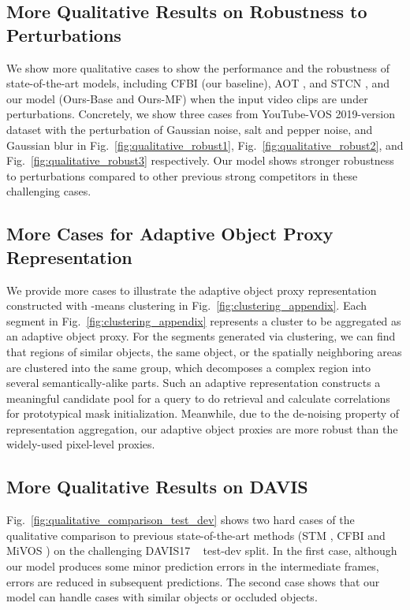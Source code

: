 \documentclass[sigconf]{acmart}
\begin{document}
\subsection{More Qualitative Results on Robustness to Perturbations}
We show more qualitative cases to show the performance and the robustness of state-of-the-art models, including CFBI \cite{yang2020collaborative} (our baseline), AOT \cite{yang2021associating}, and STCN \cite{cheng2021rethinking}, and our model (Ours-Base and Ours-MF) when the input video clips are under perturbations. Concretely, we show three cases from YouTube-VOS \cite{xu2018youtube} 2019-version dataset with the perturbation of Gaussian noise, salt and pepper noise, and Gaussian blur in Fig.~\ref{fig:qualitative_robust1}, Fig.~\ref{fig:qualitative_robust2}, and Fig.~\ref{fig:qualitative_robust3} respectively. Our model shows stronger robustness to perturbations compared to other previous strong competitors in these challenging cases.

\subsection{More Cases for Adaptive Object Proxy Representation}
We provide more cases to illustrate the adaptive object proxy representation constructed with -means clustering in Fig.~\ref{fig:clustering_appendix}. Each segment in Fig.~\ref{fig:clustering_appendix} represents a cluster to be aggregated as an adaptive object proxy. For the segments generated via clustering, we can find that regions of similar objects, the same object, or the spatially neighboring areas are clustered into the same group, which decomposes a complex region into several semantically-alike parts. Such an adaptive representation constructs a meaningful candidate pool for a query to do retrieval and calculate correlations for prototypical mask initialization. Meanwhile, due to the de-noising property of representation aggregation, our adaptive object proxies are more robust than the widely-used pixel-level proxies. 




\subsection{More Qualitative Results on DAVIS}
Fig.~\ref{fig:qualitative_comparison_test_dev} shows two hard cases of the 
    qualitative comparison to previous state-of-the-art methods (STM \cite{oh2019video}, CFBI \cite{yang2020collaborative} and MiVOS \cite{cheng2021modular}) on the challenging DAVIS17 ~\cite{ponttuset20182017} test-dev split. In the first case, although our model produces some minor prediction errors in the intermediate frames, errors are reduced in subsequent predictions. The second case shows that our model can handle cases with similar objects or occluded objects.
        
\end{document}
